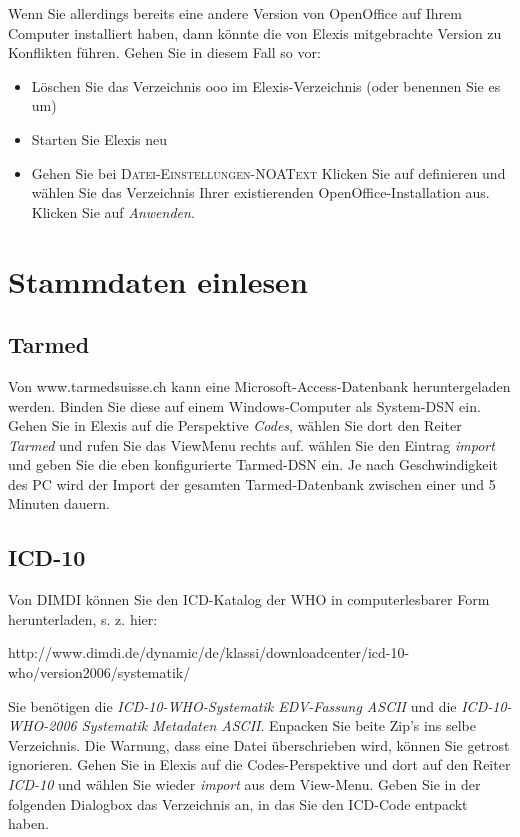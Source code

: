 Wenn Sie allerdings bereits eine andere Version von OpenOffice auf Ihrem Computer installiert haben, dann könnte die von Elexis mitgebrachte Version zu Konflikten führen. Gehen Sie in diesem Fall so vor:
\begin{itemize}
\item Löschen Sie das Verzeichnis ooo im Elexis-Verzeichnis (oder benennen Sie es um)
\item Starten Sie Elexis neu
\item Gehen Sie bei \textsc{Datei-Einstellungen-NOAText} Klicken Sie auf \glqq definieren\grqq{} und wählen Sie das Verzeichnis Ihrer existierenden OpenOffice-Installation aus. Klicken Sie auf \textit{Anwenden}.

\end{itemize}
\section{Stammdaten einlesen}
\subsection{Tarmed}
Von www.tarmedsuisse.ch kann eine Microsoft-Access-Datenbank heruntergeladen werden. Binden Sie diese auf einem Windows-Computer als System-DSN ein. Gehen Sie in Elexis auf die Perspektive \textit{Codes}, wählen Sie dort den Reiter \textit{Tarmed} und rufen Sie das ViewMenu rechts auf. wählen Sie den Eintrag \textit{import} und geben Sie die eben konfigurierte Tarmed-DSN ein. Je nach Geschwindigkeit des PC wird der Import der gesamten Tarmed-Datenbank zwischen einer und 5 Minuten dauern.
\subsection{ICD-10}
\label{config:icd10}
Von DIMDI können Sie den ICD-Katalog der WHO in computerlesbarer Form herunterladen, s. z. hier:

http://www.dimdi.de/dynamic/de/klassi/downloadcenter/icd-10-who/version2006/systematik/

Sie benötigen die \textit{ICD-10-WHO-Systematik EDV-Fassung ASCII} und die \textit{ICD-10-WHO-2006 Systematik Metadaten ASCII}. Enpacken Sie beite Zip's ins selbe Verzeichnis. Die Warnung, dass eine Datei überschrieben wird, können Sie getrost ignorieren. Gehen Sie in Elexis auf die Codes-Perspektive und dort auf den Reiter \textit{ICD-10} und wählen Sie wieder \textit{import} aus dem View-Menu. Geben Sie in der folgenden Dialogbox das Verzeichnis an, in das Sie den ICD-Code entpackt haben.

